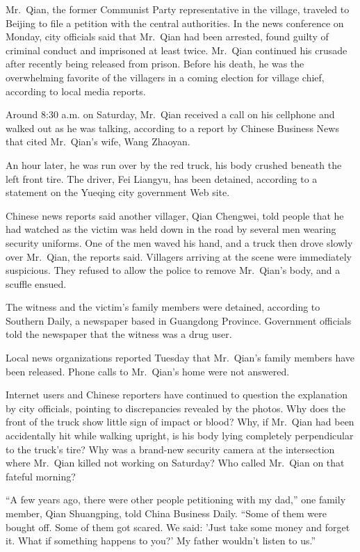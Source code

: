 ﻿\documentclass[12pt]{article}
\begin{document}
Mr.~Qian, the former Communist Party representative in the village, traveled to Beijing to file a
petition with the central authorities. In the news conference on Monday, city officials said that
Mr.~Qian had been arrested, found guilty of criminal conduct and imprisoned at least twice. Mr.~Qian
continued his crusade after recently being released from prison. Before his death, he was the
overwhelming favorite of the villagers in a coming election for village chief, according to local
media reports.

Around 8:30 a.m. on Saturday, Mr.~Qian received a call on his cellphone and walked out as he was
talking, according to a report by Chinese Business News that cited Mr.~Qian's wife, Wang Zhaoyan.

An hour later, he was run over by the red truck, his body crushed beneath the left front tire. The
driver, Fei Liangyu, has been detained, according to a statement on the Yueqing city government Web
site.

Chinese news reports said another villager, Qian Chengwei, told people that he had watched as the
victim was held down in the road by several men wearing security uniforms. One of the men waved his
hand, and a truck then drove slowly over Mr.~Qian, the reports said. Villagers arriving at the scene
were immediately suspicious. They refused to allow the police to remove Mr.~Qian's body, and a
scuffle ensued.

The witness and the victim's family members were detained, according to Southern Daily, a newspaper
based in Guangdong Province. Government officials told the newspaper that the witness was a drug
user.

Local news organizations reported Tuesday that Mr.~Qian's family members have been released. Phone
calls to Mr.~Qian's home were not answered.

Internet users and Chinese reporters have continued to question the explanation by city officials,
pointing to discrepancies revealed by the photos. Why does the front of the truck show little sign
of impact or blood? Why, if Mr.~Qian had been accidentally hit while walking upright, is his body
lying completely perpendicular to the truck's tire? Why was a brand-new security camera at the
intersection where Mr.~Qian killed not working on Saturday? Who called Mr.~Qian on that fateful
morning?

``A few years ago, there were other people petitioning with my dad,'' one family member, Qian
Shuangping, told China Business Daily. ``Some of them were bought off. Some of them got scared. We
said: 'Just take some money and forget it. What if something happens to you?' My father wouldn't
listen to us.''
\end{document}
